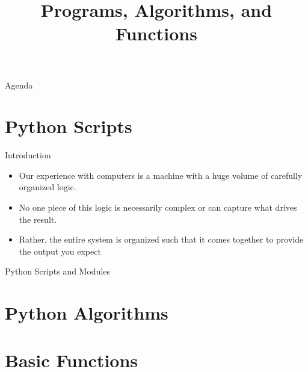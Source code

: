 \documentclass[../main.tex]{subfiles}
\title{Programs, Algorithms, and Functions}
\begin{document}
\begin{frame}
  \maketitle
\end{frame}
\begin{frame}{Agenda}
  \tableofcontents
\end{frame}

\section{Python Scripts}
\label{sec:introduction}

\begin{frame}{Introduction}
  \begin{itemize} \parskip3mm \justifying
  \item   Our experience with computers is a machine with a huge volume of carefully organized
    logic.
\item No one piece of this logic is necessarily complex or can capture what drives the
result. 
\item Rather, the entire system is organized such that it comes together to provide the
output you expect
  \end{itemize}
\end{frame}

\begin{frame}{Python Scripts and Modules}
  
\end{frame}

\section{Python Algorithms}
\label{sec:algorithms}


\section{Basic Functions}
\label{sec:functions}



\end{document}

